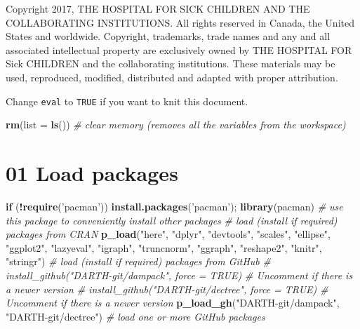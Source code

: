 \documentclass[
]{article}
\newenvironment{Shaded}{\begin{snugshade}}{\end{snugshade}}
\newcommand{\CommentTok}[1]{\textcolor[rgb]{0.56,0.35,0.01}{\textit{#1}}}
\newcommand{\ControlFlowTok}[1]{\textcolor[rgb]{0.13,0.29,0.53}{\textbf{#1}}}
\newcommand{\DataTypeTok}[1]{\textcolor[rgb]{0.13,0.29,0.53}{#1}}
\newcommand{\KeywordTok}[1]{\textcolor[rgb]{0.13,0.29,0.53}{\textbf{#1}}}
\newcommand{\NormalTok}[1]{#1}
\newcommand{\OperatorTok}[1]{\textcolor[rgb]{0.81,0.36,0.00}{\textbf{#1}}}
\newcommand{\StringTok}[1]{\textcolor[rgb]{0.31,0.60,0.02}{#1}}
\begin{document}
Copyright 2017, THE HOSPITAL FOR SICK CHILDREN AND THE COLLABORATING
INSTITUTIONS. All rights reserved in Canada, the United States and
worldwide. Copyright, trademarks, trade names and any and all associated
intellectual property are exclusively owned by THE HOSPITAL FOR Sick
CHILDREN and the collaborating institutions. These materials may be
used, reproduced, modified, distributed and adapted with proper
attribution.

\newpage

Change \texttt{eval} to \texttt{TRUE} if you want to knit this document.

\begin{Shaded}
\begin{Highlighting}[]
\KeywordTok{rm}\NormalTok{(}\DataTypeTok{list =} \KeywordTok{ls}\NormalTok{())      }\CommentTok{# clear memory (removes all the variables from the workspace)}
\end{Highlighting}
\end{Shaded}

\hypertarget{load-packages}{%
\section{01 Load packages}\label{load-packages}}

\begin{Shaded}
\begin{Highlighting}[]
\ControlFlowTok{if}\NormalTok{ (}\OperatorTok{!}\KeywordTok{require}\NormalTok{(}\StringTok{'pacman'}\NormalTok{)) }\KeywordTok{install.packages}\NormalTok{(}\StringTok{'pacman'}\NormalTok{); }\KeywordTok{library}\NormalTok{(pacman) }\CommentTok{# use this package to conveniently install other packages}
\CommentTok{# load (install if required) packages from CRAN}
\KeywordTok{p_load}\NormalTok{(}\StringTok{"here"}\NormalTok{, }\StringTok{"dplyr"}\NormalTok{, }\StringTok{"devtools"}\NormalTok{, }\StringTok{"scales"}\NormalTok{, }\StringTok{"ellipse"}\NormalTok{, }\StringTok{"ggplot2"}\NormalTok{, }\StringTok{"lazyeval"}\NormalTok{, }\StringTok{"igraph"}\NormalTok{, }\StringTok{"truncnorm"}\NormalTok{, }\StringTok{"ggraph"}\NormalTok{, }\StringTok{"reshape2"}\NormalTok{, }\StringTok{"knitr"}\NormalTok{, }\StringTok{"stringr"}\NormalTok{)                                           }
\CommentTok{# load (install if required) packages from GitHub}
\CommentTok{# install_github("DARTH-git/dampack", force = TRUE) # Uncomment if there is a newer version}
\CommentTok{# install_github("DARTH-git/dectree", force = TRUE) # Uncomment if there is a newer version}
\KeywordTok{p_load_gh}\NormalTok{(}\StringTok{"DARTH-git/dampack"}\NormalTok{, }\StringTok{"DARTH-git/dectree"}\NormalTok{) }\CommentTok{# load one or more GitHub packages  }
\end{Highlighting}
\end{Shaded}
\end{document}
